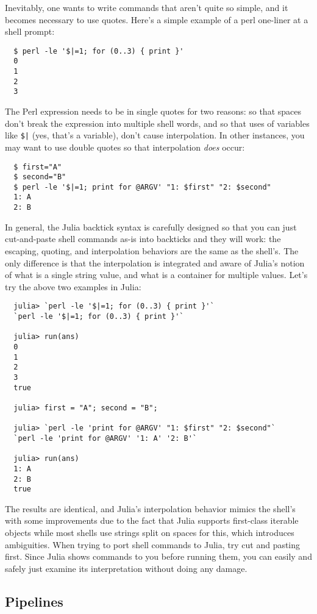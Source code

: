 \documentclass{article}
\begin{document}
Inevitably, one wants to write commands that aren't quite so simple, and it becomes necessary to use quotes.
Here's a simple example of a perl one-liner at a shell prompt:
\begin{verbatim}
  $ perl -le '$|=1; for (0..3) { print }'
  0
  1
  2
  3
\end{verbatim}
The Perl expression needs to be in single quotes for two reasons:
so that spaces don't break the expression into multiple shell words, and so that uses of variables like \texttt{\$|} (yes, that's a variable), don't cause interpolation.
In other instances, you may want to use double quotes so that interpolation \emph{does} occur:
\begin{verbatim}
  $ first="A"
  $ second="B"
  $ perl -le '$|=1; print for @ARGV' "1: $first" "2: $second"
  1: A
  2: B
\end{verbatim}
In general, the Julia backtick syntax is carefully designed so that you can just cut-and-paste shell commands as-is into backticks and they will work:
the escaping, quoting, and interpolation behaviors are the same as the shell's.
The only difference is that the interpolation is integrated and aware of Julia's notion of what is a single string value, and what is a container for multiple values.
Let's try the above two examples in Julia:
\begin{verbatim}
  julia> `perl -le '$|=1; for (0..3) { print }'`
  `perl -le '$|=1; for (0..3) { print }'`

  julia> run(ans)
  0
  1
  2
  3
  true

  julia> first = "A"; second = "B";

  julia> `perl -le 'print for @ARGV' "1: $first" "2: $second"`
  `perl -le 'print for @ARGV' '1: A' '2: B'`

  julia> run(ans)
  1: A
  2: B
  true
\end{verbatim}
The results are identical, and Julia's interpolation behavior mimics the shell's with some improvements due to the fact that Julia supports first-class iterable objects while most shells use strings split on spaces for this, which introduces ambiguities.
When trying to port shell commands to Julia, try cut and pasting first.
Since Julia shows commands to you before running them, you can easily and safely just examine its interpretation without doing any damage.

\subsection{Pipelines}
\end{document}

